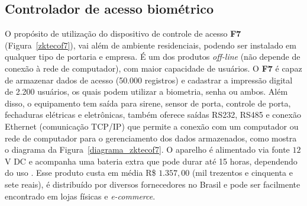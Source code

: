  \subsection{Controlador de acesso biométrico\label{F7}}

 O propósito de utilização do dispositivo de controle de acesso \textbf{F7} (Figura~\ref{zktecof7}), vai além de ambiente residenciais, podendo ser instalado em qualquer tipo de portaria e empresa. É um dos produtos \textit{off-line} (não depende de conexão à rede de computador), com maior capacidade de usuários. O \textbf{F7} é capaz de armazenar dados de acesso (50.000 registros) e cadastrar a impressão digital de 2.200 usuários, os quais podem utilizar a biometria, senha ou ambos. Além disso, o equipamento tem saída para sirene, sensor de porta, controle de porta, fechaduras elétricas e eletrônicas, também oferece saídas RS232, RS485 e conexão Ethernet (comunicação TCP/IP) que permite a conexão com um computador ou rede de computador para o gerenciamento dos dados armazenados, como mostra o diagrama da Figura~\ref{diagrama_zktecof7}. O aparelho é alimentado via fonte $12$ V DC e acompanha uma bateria extra que pode durar até 15 horas, dependendo do uso \cite{zktecof7}. Esse produto custa em média R{\$} $1.357,00$ (mil trezentos e cinquenta e sete reais), é distribuído por diversos fornecedores no Brasil e pode ser facilmente encontrado em lojas físicas e \textit{e-commerce}. 
 
 



